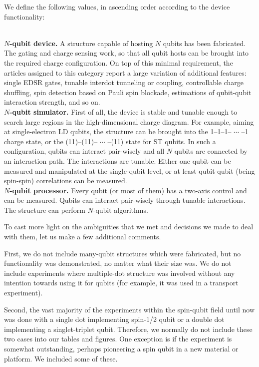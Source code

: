 \documentclass[aps, prx, showpacs, twocolumn, superscriptaddress, notitlepage, longbibliography, floatfix, nofootinbib]{revtex4-2}
\newcommand{\separate}[1]
{
 #1
}
\begin{document}
We define the following values, in ascending order according to the device functionality:
\separate{
\textbf{\\$N$-qubit device.} A structure capable of hosting $N$ qubits has been fabricated. The gating and charge sensing work, so that all qubit hosts can be brought into the required charge configuration. On top of this minimal requirement, the articles assigned to this category report a large variation of additional features: single EDSR gates, tunable interdot tunneling or coupling, controllable charge shuffling, spin detection based on Pauli spin blockade, estimations of qubit-qubit interaction strength, and so on. 
\textbf{\\$N$-qubit simulator.} First of all, the device is stable and tunable enough to search large regions in the high-dimensional charge diagram. For example, aiming at single-electron LD qubits, the structure can be brought into the 1--1--1-- $\cdots$ --1 charge state, or the (11)--(11)-- $\cdots$ --(11) state for ST qubits. In such a configuration, qubits can interact pair-wisely and all $N$ qubits are connected by an interaction path. The interactions are tunable. Either one qubit can be measured and manipulated at the single-qubit level, or at least qubit-qubit (being spin-spin) correlations can be measured.
\textbf{\\$N$-qubit processor.} Every qubit (or most of them) has a two-axis control and can be measured. Qubits can interact pair-wisely through tunable interactions. The structure can perform $N$-qubit algorithms. 
}


To cast more light on the ambiguities that we met and decisions we made to deal with them, let us make a few additional comments.

First, we do not include many-qubit structures which were fabricated, but no functionality was demonstrated, no matter what their size was. We do not include experiments where multiple-dot structure was involved without any intention towards using it for qubits (for example, it was used in a transport experiment).

Second, the vast majority of the experiments within the spin-qubit field until now was done with a single dot implementing spin-1/2 qubit or a double dot implementing a singlet-triplet qubit. Therefore, we normally do not include these two cases into our tables and figures. One exception is if the experiment is somewhat outstanding, perhaps pioneering a spin qubit in a new material or platform. We included some of these. 
\end{document}
